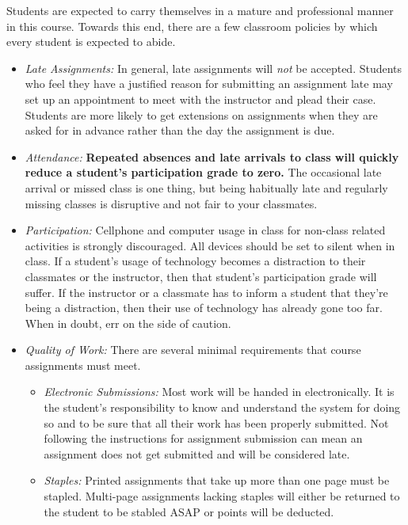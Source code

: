 \documentclass[10pt]{article}
\begin{document}
Students are expected to carry themselves in a mature and professional manner in this course. Towards this end, there are a few classroom policies by which every student is expected to abide.
\begin{itemize}

\item \textit{Late Assignments: } In general, late assignments will \textit{not} be accepted.  Students who feel they have a justified reason for submitting an assignment late may set up an appointment to meet with the instructor and plead their case.  Students are more likely to get extensions on assignments when they are asked for in advance rather than the day the assignment is due.  

\item \textit{Attendance: } \textbf{Repeated absences and late arrivals to class will quickly reduce a student's participation grade to zero.}  The occasional late arrival or missed class is one thing, but being habitually late and regularly missing classes is disruptive and not fair to your classmates.  

\item \textit{Participation: }  Cellphone and computer usage in class for non-class related activities is strongly discouraged.  All devices should be set to silent when in class.  If a student's usage of technology becomes a distraction to their classmates or the instructor, then that student's participation grade will suffer.  If the instructor or a classmate has to inform a student that they're being a distraction, then their use of technology has already gone too far.  When in doubt, err on the side of caution. 

\item \textit{Quality of Work:} There are several minimal requirements that course assignments must meet.
\begin{itemize}
\item \textit{Electronic Submissions:}  Most work will be handed in electronically.  It is the student's responsibility to know and understand the system for doing so and to be sure that all their work has been properly submitted. Not following the instructions for assignment submission can mean an assignment does not get submitted and will be considered late. 

\item \textit{Staples:} Printed assignments that take up more than one page must be stapled.  Multi-page  assignments lacking staples will either be returned to the student to be stabled ASAP or points will be deducted.  


\end{itemize}
\end{itemize}
\end{document}
